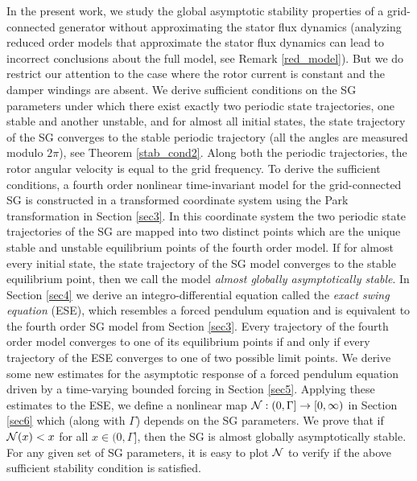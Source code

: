 \documentclass[12pt]{article}
\theoremstyle{definition}
\numberwithin{equation}{section}                        %
\newcommand{\Nscr} {{\cal N}}
\begin{document}
In the present work, we study the global asymptotic stability
properties of a grid-connected generator without approximating the
stator flux dynamics (analyzing reduced order models that approximate
the stator flux dynamics can lead to incorrect conclusions about the
full model, see Remark \ref{red_model}). But we do restrict our attention
to the case where the rotor current is constant and the damper windings
are absent. We derive sufficient conditions on the SG parameters under
which there exist exactly two periodic state trajectories, one stable
and another unstable, and for almost all initial states, the state
trajectory of the SG converges to the stable periodic trajectory (all
the angles are measured modulo $2\pi$), see Theorem \ref{stab_cond2}.
Along both the periodic trajectories, the rotor angular velocity is
equal to the grid frequency. To derive the sufficient conditions, a
fourth order nonlinear time-invariant model for the grid-connected SG
is constructed in a transformed coordinate system using the Park
transformation in Section \ref{sec3}. In this coordinate system the
two periodic state trajectories of the SG are mapped into two distinct
points which are the unique stable and unstable equilibrium points of
the fourth order model. If for almost every initial state, the state
trajectory of the SG model converges to the stable equilibrium point,
then we call the model {\em almost globally asymptotically stable}. In
Section \ref{sec4} we derive an integro-differential equation called
the {\em exact swing equation} (ESE), which resembles a forced
pendulum equation and is equivalent to the fourth order SG model from
Section \ref{sec3}. Every trajectory of the fourth order model
converges to one of its equilibrium points if and only if every
trajectory of the ESE converges to one of two possible limit
points. We derive some new estimates for the asymptotic response of a
forced pendulum equation driven by a time-varying bounded forcing in Section
\ref{sec5}. Applying these estimates to the ESE, we define a nonlinear
map $\Nscr:(0,\Gamma]\to[0,\infty)$ in Section \ref{sec6} which (along
with $\Gamma$) depends on the SG parameters. We prove that if
$\Nscr(x) <x$ for all $x\in (0,\Gamma]$, then the SG is almost
globally asymptotically stable. For any given set of SG parameters, it
is easy to plot $\Nscr$ to verify if the above sufficient stability
condition is satisfied.
\end{document}
